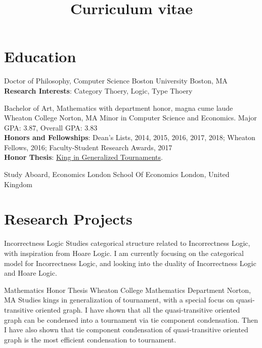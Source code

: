 \documentclass[11pt,a4paper,roman]{moderncv}        %
\title{Curriculum vitae}
\begin{document}

\makecvtitle{}

\setlength{\parskip}{2.5px}
\linespread{1.3}
\selectfont


\section{Education}

{Doctor of Philosophy, Computer Science} {}
{Boston University}
{Boston, MA}
{\textbf{Research Interests}: Category Thoery, Logic, Type Thoery}  %

{Bachelor of Art, Mathematics} {with department honor, magna cume laude}
{Wheaton College}
{Norton, MA}
{Minor in Computer Science and Economics.
Major GPA\@: 3.87, Overall GPA\@: 3.83\\
\textbf{Honors and Fellowships}: Dean's Lists, 2014, 2015, 2016, 2017, 2018;
Wheaton Fellows, 2016;
Faculty-Student Research Awards, 2017\\
\textbf{Honor Thesis}: \href{http://hdl.handle.net/11040/24570}{King in Generalized Tournaments}.
}

{Study Aboard, Economics} {}
{London School Of Economics}
{London, United Kingdom}
{}  %


\section{Research Projects}

{Incorrectness Logic}
{}{}{}
{Studies categorical structure related to Incorrectness Logic,
with inspiration from Hoare Logic.
I am currently focusing on the categorical model for 
Incorrectness Logic, 
and looking into the duality of Incorrectness Logic 
and Hoare Logic.
}

{Mathematics Honor Thesis}
{Wheaton College Mathematics Department}
{Norton, MA}{}
{Studies kings in generalization of tournament,
with a special focus on quasi-transitive oriented graph.
I have shown that all the quasi-transitive oriented graph
can be condensed into a tournament 
via tie component condensation.
Then I have also shown that tie component condensation
of quasi-transitive oriented graph is the 
most efficient condensation to tournament.
}
\end{document}
